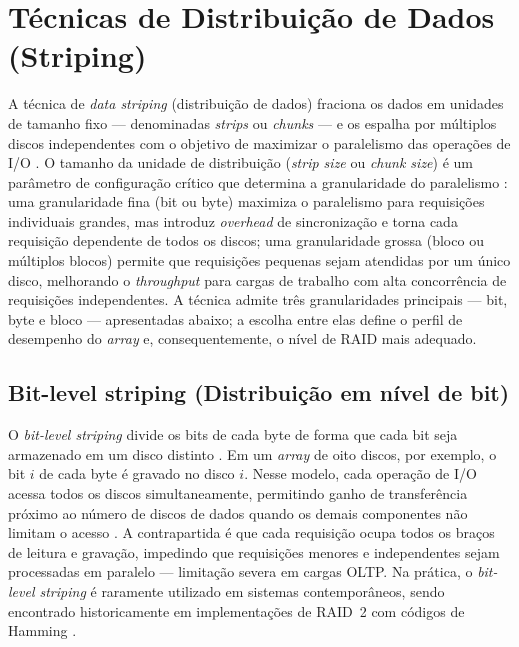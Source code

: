 \documentclass[titlepage]{article}
\begin{document}
\section{Técnicas de Distribuição de Dados (Striping)}
\label{sec:striping}
A técnica de \textit{data striping} (distribuição de dados) fraciona os dados em unidades de tamanho fixo --- denominadas \textit{strips} ou \textit{chunks} --- e os espalha por múltiplos discos independentes com o objetivo de maximizar o paralelismo das operações de I/O \cite{silberschatz2020}. O tamanho da unidade de distribuição (\textit{strip size} ou \textit{chunk size}) é um parâmetro de configuração crítico que determina a granularidade do paralelismo \cite{garciamolina2009}: uma granularidade fina (bit ou byte) maximiza o paralelismo para requisições individuais grandes, mas introduz \textit{overhead} de sincronização e torna cada requisição dependente de todos os discos; uma granularidade grossa (bloco ou múltiplos blocos) permite que requisições pequenas sejam atendidas por um único disco, melhorando o \textit{throughput} para cargas de trabalho com alta concorrência de requisições independentes. A técnica admite três granularidades principais --- bit, byte e bloco --- apresentadas abaixo; a escolha entre elas define o perfil de desempenho do \textit{array} e, consequentemente, o nível de RAID mais adequado.

\subsection{Bit-level striping (Distribuição em nível de bit)}
O \textit{bit-level striping} divide os bits de cada byte de forma que cada bit seja armazenado em um disco distinto \cite{silberschatz2020}. Em um \textit{array} de oito discos, por exemplo, o bit $i$ de cada byte é gravado no disco $i$. Nesse modelo, cada operação de I/O acessa todos os discos simultaneamente, permitindo ganho de transferência próximo ao número de discos de dados quando os demais componentes não limitam o acesso \cite{silberschatz2020}. A contrapartida é que cada requisição ocupa todos os braços de leitura e gravação, impedindo que requisições menores e independentes sejam processadas em paralelo --- limitação severa em cargas OLTP. Na prática, o \textit{bit-level striping} é raramente utilizado em sistemas contemporâneos, sendo encontrado historicamente em implementações de RAID~2 com códigos de Hamming \cite{garciamolina2009}.
\end{document}
